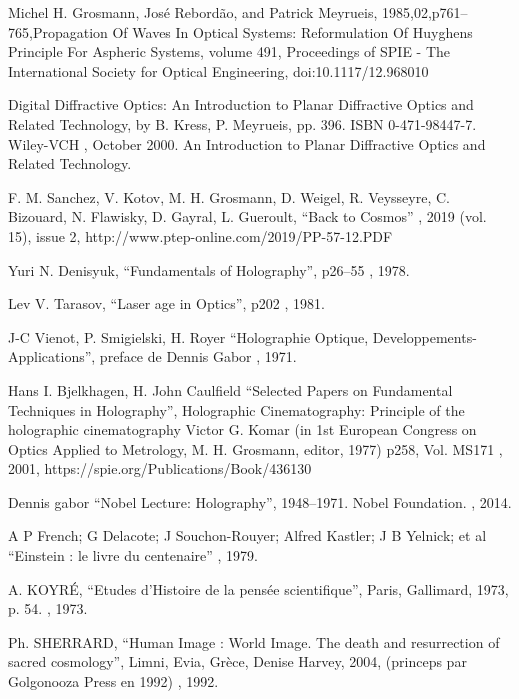 \documentclass[a4paper,12pt]{article}
\begin{document}
\begin{appendix}
\begin{thebibliography}{1}
 Michel H. Grosmann, José Rebordão,  and Patrick Meyrueis, 1985,02,p761--765,Propagation Of Waves In Optical Systems: Reformulation Of Huyghens Principle For Aspheric Systems, volume 491, Proceedings of SPIE - The International Society for Optical Engineering, doi:10.1117/12.968010

 Digital Diffractive Optics: An Introduction to Planar Diffractive Optics and Related Technology, by B. Kress, P. Meyrueis, pp. 396. ISBN 0-471-98447-7. Wiley-VCH , October 2000.
\newblock An Introduction to Planar Diffractive Optics and Related Technology.

 F. M. Sanchez, V. Kotov, M. H. Grosmann, D. Weigel, R. Veysseyre, C. Bizouard, N. Flawisky, D. Gayral, L. Gueroult, ``Back to Cosmos''
, 2019 (vol. 15), issue 2, http://www.ptep-online.com/2019/PP-57-12.PDF

 Yuri N. Denisyuk, ``Fundamentals of Holography'', p26--55
, 1978.

 Lev V. Tarasov, ``Laser age in Optics'', p202
, 1981.

 J-C Vienot, P. Smigielski, H. Royer ``Holographie Optique, Developpements-Applications'', preface de Dennis Gabor
, 1971.

 Hans I. Bjelkhagen, H. John Caulfield ``Selected Papers on Fundamental Techniques in Holography'', Holographic Cinematography: Principle of the holographic cinematography Victor G. Komar (in 1st European Congress on Optics Applied to Metrology, M. H. Grosmann, editor, 1977) p258, Vol. MS171
, 2001, https://spie.org/Publications/Book/436130

 Dennis gabor ``Nobel Lecture: Holography'', 1948–1971. Nobel Foundation.
, 2014.

 A P French; G Delacote; J Souchon-Rouyer; Alfred Kastler; J B Yelnick; et al ``Einstein : le livre du centenaire''
, 1979.

 A. KOYRÉ, ``Etudes d’Histoire de la pensée scientifique'', Paris, Gallimard, 1973, p. 54.
, 1973.

 Ph. SHERRARD, ``Human Image : World Image. The death and resurrection of sacred cosmology'', Limni, Evia, Grèce, Denise Harvey, 2004, (princeps par Golgonooza Press en 1992)
, 1992.


\end{thebibliography}
\end{appendix}
\end{document}
